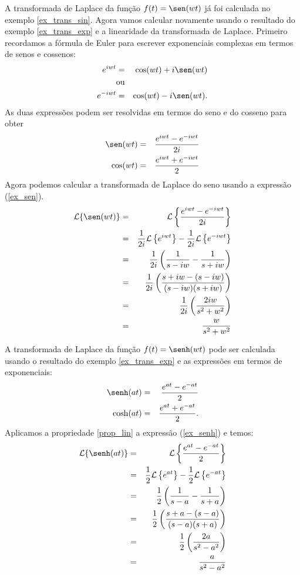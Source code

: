 \begin{ex}{\label{ex_trans_sin_2}} A transformada de Laplace da função $f(t)=\sen(wt)$ já foi calculada no exemplo \ref{ex_trans_sin}. Agora vamos calcular novamente usando o resultado do exemplo \ref{ex_trans_exp} e a linearidade da transformada de Laplace. Primeiro recordamos a fórmula de Euler para escrever exponenciais complexas em termos de senos e cossenos:
\begin{eqnarray*}
e^{iwt}&=&\cos(wt)+i\sen(wt)\\
&\hbox{ou}&\\
e^{-iwt}&=&\cos(wt)-i\sen(wt) .
\end{eqnarray*}
As duas expressões podem ser resolvidas em termos do seno e do cosseno para obter
\begin{eqnarray}
{\label{ex_sen}} \sen(wt)&=&\frac{e^{iwt}-e^{-iwt}}{2i}\\
{\label{ex_cos}} \cos(wt)&=&\frac{e^{iwt}+e^{-iwt}}{2}
\end{eqnarray}
Agora podemos calcular a transformada de Laplace do seno usando a expressão (\ref{ex_sen}).
\begin{eqnarray*}
\mathcal{L }\{\sen(wt)\}&=&\mathcal{L }\left\{\frac{e^{iwt}-e^{-iwt}}{2i}\right\}\\
&=&\frac{1}{2i} \mathcal{L }\left\{ e^{iwt}\right\}-\frac{1}{2i} \mathcal{L }\left\{ e^{-iwt}\right\}\\
&=&\frac{1}{2i}\left( \frac{1}{s-iw}- \frac{1}{s+iw}\right)\\
&=&\frac{1}{2i}\left( \frac{s+iw-(s-iw)}{(s-iw)(s+iw)}\right)\\
&=&\frac{1}{2i}\left( \frac{2iw}{s^2+w^2}\right)\\
&=&\frac{w}{s^2+w^2}
\end{eqnarray*}
\end{ex}
\begin{ex} A transformada de Laplace da função $f(t)=\senh(wt)$ pode ser calculada usando o resultado do exemplo \ref{ex_trans_exp} e as expressões em termos de exponenciais:
\begin{eqnarray}
{\label{ex_senh}} \senh(at)&=&\frac{e^{at}-e^{-at}}{2}\\
{\label{ex_cosh}} \cosh(at)&=&\frac{e^{at}+e^{-at}}{2}.
\end{eqnarray}
Aplicamos a propriedade \ref{prop_lin} a expressão (\ref{ex_senh}) e temos:
\begin{eqnarray*}
\mathcal{L }\{\senh(at)\}&=&\mathcal{L }\left\{\frac{e^{at}-e^{-at}}{2}\right\}\\
&=&\frac{1}{2} \mathcal{L }\left\{ e^{at}\right\}-\frac{1}{2} \mathcal{L }\left\{ e^{-at}\right\}\\
&=&\frac{1}{2}\left( \frac{1}{s-a}- \frac{1}{s+a}\right)\\
&=&\frac{1}{2}\left( \frac{s+a-(s-a)}{(s-a)(s+a)}\right)\\
&=&\frac{1}{2}\left( \frac{2a}{s^2-a^2}\right)\\
&=&\frac{a}{s^2-a^2}
\end{eqnarray*}
\end{ex}
